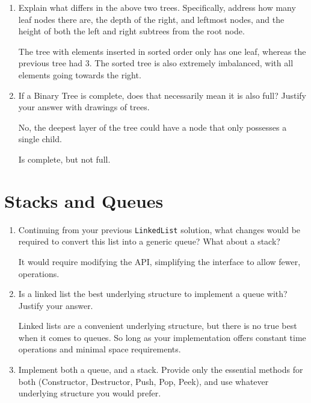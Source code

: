 \documentclass[11pt]{article}
\begin{document}
\begin{enumerate}
        \item Explain what differs in the above two trees. Specifically, address how many leaf nodes there are, the depth of the right, and leftmost nodes, and the height of both the left and right subtrees from the root node.

        The tree with elements inserted in sorted order only has one leaf, whereas the previous tree had 3. The sorted tree is also extremely imbalanced, with all elements going towards the right. 
        
        \item If a Binary Tree is complete, does that necessarily mean it is also full? Justify your answer with drawings of trees.

        No, the deepest layer of the tree could have a node that only possesses a single child.
        

        Is complete, but not full.

    \end{enumerate}
    
    \section{Stacks and Queues}
    \begin{enumerate}
        \item Continuing from your previous \verb|LinkedList| solution, what changes would be required to convert this list into a generic queue? What about a stack?

        It would require modifying the API, simplifying the interface to allow fewer, operations.

        \item Is a linked list the best underlying structure to implement a queue with? Justify your answer. 

        Linked lists are a convenient underlying structure, but there is no true best when it comes to queues. So long as your implementation offers constant time operations and minimal space requirements.

        \item Implement both a queue, and a stack. Provide only the essential methods for both (Constructor, Destructor, Push, Pop, Peek), and use whatever underlying structure you would prefer.
    \end{enumerate}
    
    \label{r:lastpage}
    
    
\end{document}
